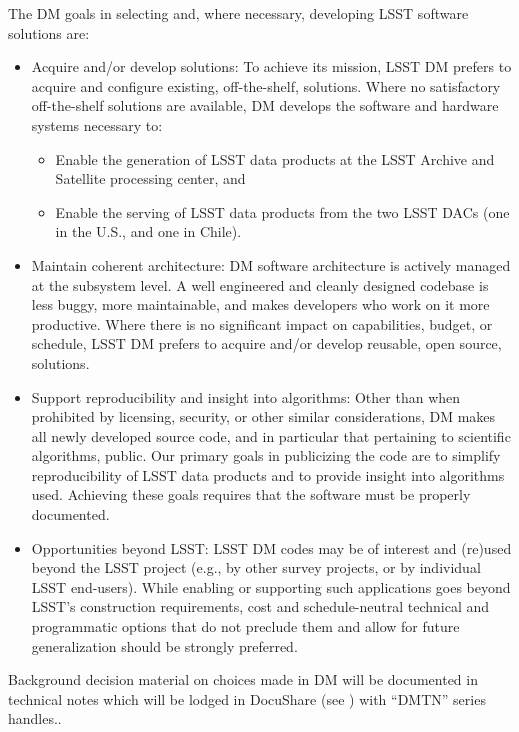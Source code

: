 The DM goals in selecting and, where necessary, developing LSST software solutions are:
\begin{itemize}
	\item Acquire and/or develop solutions: To achieve its mission, LSST DM prefers to acquire and configure existing, off-the-shelf, solutions. Where no satisfactory off-the-shelf solutions are available, DM develops the software and hardware systems necessary to:
\begin{itemize}
	\item Enable the generation of LSST data products at the LSST Archive and Satellite processing center, and
	\item Enable the serving of LSST data products from the two LSST DACs (one in the U.S., and one in Chile).
\end{itemize}
	\item Maintain coherent architecture: DM software architecture is actively managed at the subsystem level. A well engineered and cleanly designed codebase is less buggy, more maintainable, and makes developers who work on it more productive. Where there is no significant impact on capabilities, budget, or schedule, LSST DM prefers to acquire and/or develop reusable, open source, solutions.
	\item Support reproducibility and insight into algorithms: Other than when prohibited by licensing, security, or other similar considerations, DM makes all newly developed source code, and in particular that pertaining to scientific algorithms,  public. Our primary goals in publicizing the code are to simplify reproducibility of LSST data products and to provide insight into algorithms used. Achieving these goals requires that the software must be properly documented.
	\item Opportunities beyond LSST: LSST DM codes may be of interest and (re)used beyond the LSST project (e.g., by other survey projects, or by individual LSST end-users). While enabling or supporting such applications goes beyond LSST’s construction requirements, cost and schedule-neutral technical and programmatic options that do not preclude them and allow for future generalization should be strongly preferred.


\end{itemize}

Background decision material on choices made in DM will be documented in technical notes which will be lodged in DocuShare (see ) with ``DMTN'' series handles..
